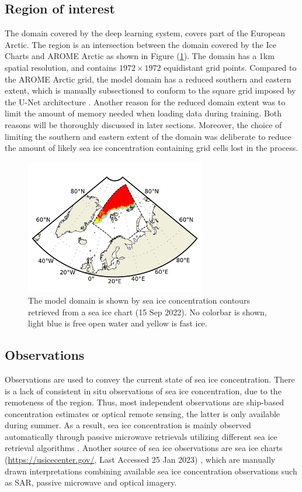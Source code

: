 \documentclass[../main/thesis.tex]{subfiles}
\begin{document}
\subsection{Region of interest}
The domain covered by the deep learning system, covers part of the European Arctic. The region is an intersection between the domain covered by the Ice Charts \citep{Dinessen2020} and AROME Arctic \citep{Mueller2017} as shown in Figure (\ref{fig:studyarea}). The domain has a 1km spatial resolution, and contains $1972 \times 1972$ equidistant grid points. Compared to the AROME Arctic grid, the model domain has a reduced southern and eastern extent, which is manually subsectioned to conform to the square grid imposed by the U-Net architecture \citep{Ronneberger2015}. Another reason for the reduced domain extent was to limit the amount of memory needed when loading data during training. Both reasons will be thoroughly discussed in later sections. Moreover, the choice of limiting the southern and eastern extent of the domain was deliberate to reduce the amount of likely sea ice concentration containing grid cells lost in the process.

\begin{figure}
    \centering
    \includegraphics[width = 0.7\textwidth]{study_area}
    \caption{\label{fig:studyarea}The model domain is shown by sea ice concentration contours retrieved from a sea ice chart (15 Sep 2022). No colorbar is shown, light blue is free open water and yellow is fast ice.}
\end{figure}

\subsection{Observations}
Observations are used to convey the current state of sea ice concentration. There is a lack of consistent in situ observations of sea ice concentration, due to the remoteness of the region. Thus, most independent observations are ship-based concentration estimates \citep{Kern2019} or optical remote sensing, the latter is only available during summer. As a result, sea ice concentration is mainly observed automatically through passive microwave retrievals utilizing different sea ice retrieval algorithms \citep{Lavergne2019a, Comiso1997,Spreen2008}. Another source of sea ice observations are sea ice charts (\url{https://usicecenter.gov/}, Last Accessed 25 Jan 2023) \citep{Dinessen2020}, which are manually drawn interpretations combining available sea ice concentration observations such as SAR, passive microwave and optical imagery. 
\end{document}
